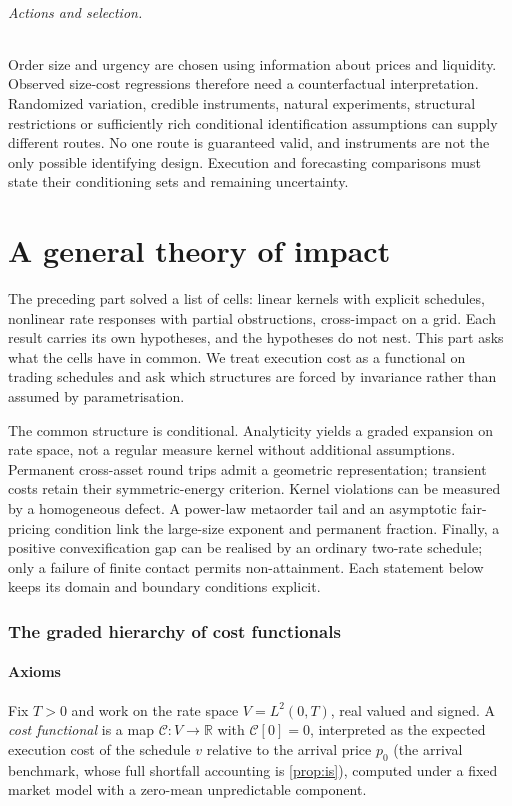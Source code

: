 \documentclass[11pt]{article}
\numberwithin{equation}{section}
\theoremstyle{definition}
\theoremstyle{remark}
\newcommand{\R}{\mathbb{R}}
\theoremstyle{definition}
\begin{document}
\paragraph{Actions and selection.}
Order size and urgency are chosen using information about prices and liquidity.
Observed size-cost regressions therefore need a counterfactual interpretation.
Randomized variation, credible instruments, natural experiments, structural
restrictions or sufficiently rich conditional identification assumptions can
supply different routes. No one route is guaranteed valid, and instruments are
not the only possible identifying design. Execution and forecasting comparisons
must state their conditioning sets and remaining uncertainty.

\part{A general theory of impact}\label{pt:general}

The preceding part solved a list of cells: linear kernels with explicit
schedules, nonlinear rate responses with partial obstructions, cross-impact on a
grid. Each result carries its own hypotheses, and the hypotheses do not nest.
This part asks what the cells have in common. We treat execution cost as a
functional on trading schedules and ask which structures are forced by
invariance rather than assumed by parametrisation.

The common structure is conditional. Analyticity yields a graded expansion
on rate space, not a regular measure kernel without additional assumptions.
Permanent cross-asset round trips admit a geometric representation; transient
costs retain their symmetric-energy criterion. Kernel violations can be
measured by a homogeneous defect. A power-law metaorder tail and an asymptotic
fair-pricing condition link the large-size exponent and permanent fraction.
Finally, a positive convexification gap can be realised by an ordinary
two-rate schedule; only a failure of finite contact permits non-attainment.
Each statement below keeps its domain and boundary conditions explicit.

\section{The graded hierarchy of cost functionals}\label{sec:hierarchy}

\subsection{Axioms}
Fix $T>0$ and work on the rate space $V=L^2(0,T)$, real valued and signed. A
\emph{cost functional} is a map $\mathcal C:V\to\R$ with $\mathcal C[0]=0$,
interpreted as the expected execution cost of the schedule $v$ relative to the
arrival price $p_0$ (the arrival benchmark, whose full shortfall accounting is
\cref{prop:is}), computed under a fixed market model with a
zero-mean unpredictable component.
\end{document}
